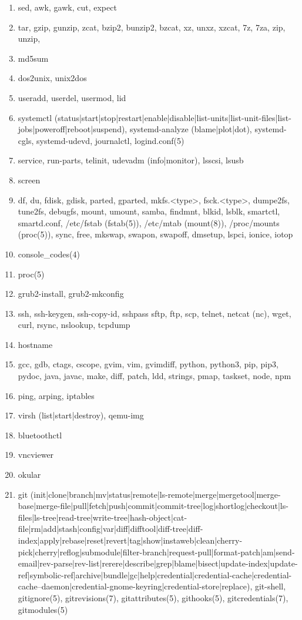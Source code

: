\documentclass{article}
\begin{document}
\begin{enumerate}
\begin{enumerate}
            \item sed, awk, gawk, cut, expect
            \item tar, gzip, gunzip, zcat, bzip2, bunzip2, bzcat, xz, unxz, xzcat, 7z, 7za, zip, unzip,
            \item md5sum
            \item dos2unix, unix2dos
            \item useradd, userdel, usermod, lid
            \item systemctl (status|start|stop|restart|enable|disable|list-units|list-unit-files|list-jobs|poweroff|reboot|suspend), systemd-analyze (blame|plot|dot), systemd-cgls, systemd-udevd, journalctl, logind.conf(5)
            \item service, run-parts, telinit, udevadm (info|monitor), lsscsi, lsusb
            \item screen
            \item df, du, fdisk, gdisk, parted, gparted, mkfs.<type>, fsck.<type>, dumpe2fs, tune2fs, debugfs, mount, umount, samba, findmnt, blkid, lsblk, smartctl, smartd.conf, /etc/fstab (fstab(5)), /etc/mtab (mount(8)), /proc/mounts (proc(5)), sync, free, mkswap, swapon, swapoff, dmsetup, lspci, ionice, iotop
            \item console_codes(4)
            \item proc(5)
            \item grub2-install, grub2-mkconfig
            \item ssh, ssh-keygen, ssh-copy-id, sshpass sftp, ftp, scp, telnet, netcat (nc), wget, curl, rsync, nslookup, tcpdump
            \item hostname
            \item gcc, gdb, ctags, cscope, gvim, vim, gvimdiff, python, python3, pip, pip3, pydoc, java, javac, make, diff, patch, ldd, strings, pmap, taskset, node, npm
            \item ping, arping, iptables
            \item virsh (list|start|destroy), qemu-img
            \item bluetoothctl
            \item vncviewer
            \item okular
            \item git (init|clone|branch|mv|status|remote|ls-remote|merge|mergetool|merge-base|merge-file|pull|fetch|push|commit|commit-tree|log|shortlog|checkout|ls-files|ls-tree|read-tree|write-tree|hash-object|cat-file|rm|add|stash|config|var|diff|difftool|diff-tree|diff-index|apply|rebase|reset|revert|tag|show|instaweb|clean|cherry-pick|cherry|reflog|submodule|filter-branch|request-pull|format-patch|am|send-email|rev-parse|rev-list|rerere|describe|grep|blame|bisect|update-index|update-ref|symbolic-ref|archive|bundle|gc|help|credential|credential-cache|credential-cache--daemon|credential-gnome-keyring|credential-store|replace), git-shell, gitignore(5), gitrevisions(7), gitattributes(5), githooks(5), gitcredentials(7), gitmodules(5)

\end{enumerate}
\end{enumerate}
\end{document}
